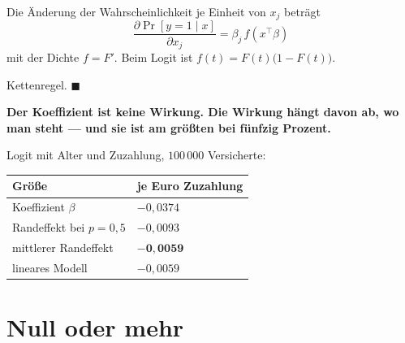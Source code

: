 \begin{merksatz}
Die Änderung der Wahrscheinlichkeit je Einheit von $x_j$ beträgt
\[ \frac{\partial\Pr[y=1\mid x]}{\partial x_j} = \beta_j\,f(x^{\top}\beta) \]
mit der Dichte $f = F'$. Beim Logit ist $f(t) = F(t)\bigl(1-F(t)\bigr)$.

Kettenregel. $\blacksquare$

\begin{center}
\begin{minipage}{0.9\textwidth}
\textbf{Der Koeffizient ist keine Wirkung. Die Wirkung hängt davon ab, wo man steht --- und sie ist am größten bei fünfzig Prozent.}
\end{minipage}
\end{center}

Logit mit Alter und Zuzahlung, $100\,000$ Versicherte:

\begin{center}
{\small
\renewcommand{\arraystretch}{1.48}
\begin{tabular}{@{}P{3.6cm}P{2.6cm}@{}}
\toprule
\textbf{Größe} & \textbf{je Euro Zuzahlung}\\
\midrule
Koeffizient $\beta$ & $-0{,}0374$\\
Randeffekt bei $p = 0{,}5$ & $-0{,}0093$\\
mittlerer Randeffekt & $\mathbf{-0{,}0059}$\\
lineares Modell & $-0{,}0059$\\
\bottomrule
\end{tabular}}
\end{center}

\begin{center}
\begin{minipage}{0.88\textwidth}
\end{minipage}
\end{center}
\end{merksatz}

\section{Null oder mehr}

